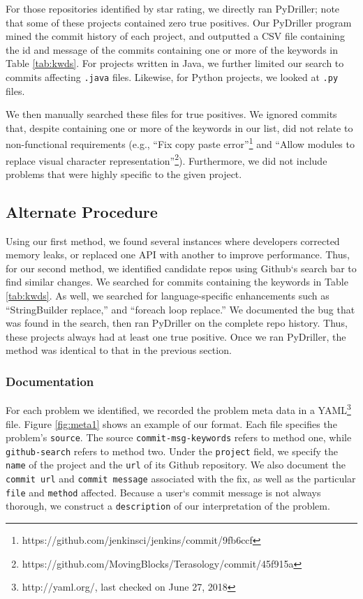 \documentclass[sigconf]{acmart}
\begin{document}
For those repositories identified by star rating, we directly ran PyDriller; note that some of these projects contained zero true positives. 
Our PyDriller program mined the commit history of each project, and outputted a CSV file containing the id and message of the commits containing one or more of the keywords in Table \ref{tab:kwds}. For projects written in Java, we further limited our search to commits affecting \texttt{.java} files. Likewise, for Python projects, we looked at \texttt{.py} files.

We then manually searched these files for true positives. We ignored commits that, despite containing one or more of the keywords in our list, did not relate to non-functional requirements (e.g., ``Fix copy paste error''\footnote{https://github.com/jenkinsci/jenkins/commit/9fb6ccf} and ``Allow modules to replace visual character representation''\footnote{https://github.com/MovingBlocks/Terasology/commit/45f915a}). Furthermore, we did not include problems that were highly specific to the given project. 


\subsection{Alternate Procedure}
Using our first method, we found several instances where developers corrected memory leaks, or replaced one API with another to improve performance. Thus, for our second method, we identified candidate repos using Github`s search bar to find similar changes. We searched for commits containing the keywords in Table \ref{tab:kwds}. As well, we searched for language-specific enhancements such as ``StringBuilder replace,'' and ``foreach loop replace.'' We documented the bug that was found in the search, then ran PyDriller on the complete repo history. Thus, these projects always had at least one true positive. Once we ran PyDriller, the method was identical to that in the previous section.

\subsubsection{Documentation} 
For each problem we identified, we recorded the problem meta data in a YAML\footnote{http://yaml.org/, last checked on June 27, 2018} file. Figure \ref{fig:meta1} shows an example of our format. Each file specifies the problem's \texttt{source}. The source \texttt{commit-msg-keywords} refers to method one, while \texttt{github-search} refers to method two. Under the \texttt{project} field, we specify the \texttt{name} of the project and the \texttt{url} of its Github repository. We also document the \texttt{commit url} and \texttt{commit message} associated with the fix, as well as the particular \texttt{file} and \texttt{method} affected. Because a user`s commit message is not always thorough, we construct a \texttt{description} of our interpretation of the problem.
\end{document}
